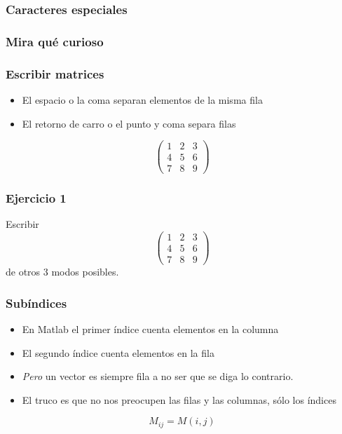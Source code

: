 \documentclass[12pt]{beamer}
\begin{document}
\begin{frame}
\frametitle{Caracteres especiales}
\testcode
\end{frame}



\begin{frame}
  \frametitle{Mira qué curioso}
  \testcode
\end{frame}

\begin{frame}
\frametitle{Escribir matrices}
\begin{itemize}
  \item El espacio o la coma separan elementos de la misma fila
  \item El retorno de carro o el punto y coma separa filas
\end{itemize}
\[ \left(
\begin{array}{ccc}
1&2&3\\
4&5&6\\
7&8&9
\end{array} \right)
\]
\end{frame}



\begin{frame}
\frametitle{Ejercicio 1}
\testcode
Escribir 
\[ \left(
\begin{array}{ccc}
1&2&3\\
4&5&6\\
7&8&9
\end{array} \right)
\]
de otros 3 modos posibles.
\end{frame}

\begin{frame}
\frametitle{Subíndices}
\begin{itemize}
  \item En Matlab el primer índice cuenta elementos en la columna
  \item El segundo índice cuenta elementos en la fila
  \item \emph{Pero} un vector es siempre fila a no ser que se diga lo
    contrario.
  \item El truco es que no nos preocupen las filas y las columnas,
    sólo los índices
\end{itemize}
\[ M_{ij} = M(i,j) \]
\end{frame}
\end{document}
